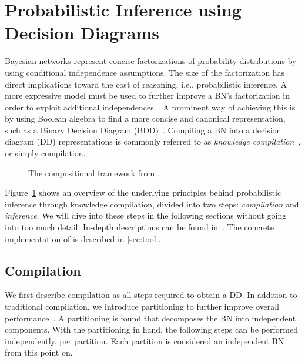 
\section{Probabilistic Inference using Decision Diagrams}\label{sec:parallel}

Bayesian networks represent concise factorizations of probability distributions by using conditional independence assumptions. The size of the factorization has direct implications toward the cost of reasoning, i.e., probabilistic inference. A more expressive model must be used to further improve a BN's factorization in order to exploit additional independences~\cite{boutilier1996context,friedman1998learning,zhang1996exploiting}. A prominent way of achieving this is by using Boolean algebra to find a more concise and canonical representation, such as a Binary Decision Diagram (BDD)~\cite{bryant1986graph}. Compiling a BN into a decision diagram (DD) representations is commonly referred to as \emph{knowledge compilation}~\cite{darwiche2002knowledge}, or simply compilation.


\begin{figure}[!t]
    \centering

    \scalebox{0.9}{
    
    }
    \caption{The compositional framework from \cite{dal2021compositional}.}
    \label{fig:frameworkoverview}
\end{figure}


Figure~\ref{fig:frameworkoverview} shows an overview of the underlying principles behind probabilistic inference through knowledge compilation, divided into two steps: \emph{compilation} and \emph{inference}. We will dive into these steps in the following sections without going into too much detail. In-depth descriptions can be found in~\cite{dal2021compositional}. The concrete implementation of \toolname is described in \autoref{sec:tool}.

\subsection{Compilation}

We first describe compilation as all steps required to obtain a DD. In addition to traditional compilation, we introduce partitioning to further improve overall performance~\cite{dal2017reducing}.
A partitioning is found that decomposes the BN into independent components. With the partitioning in hand, the following steps can be performed independently, per partition. Each partition is considered an independent BN from this point on.

